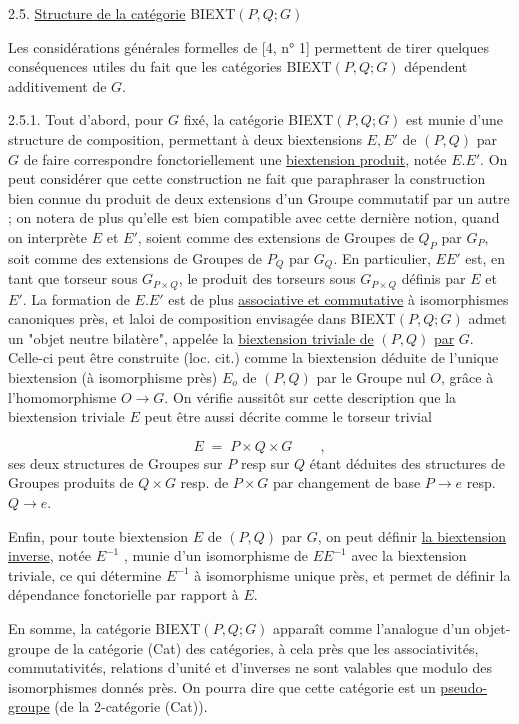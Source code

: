 2.5. \underline{Structure de la catégorie} BIEXT$(P,Q;G)$

Les considérations générales formelles de [4, n° 1] permettent de tirer quelques conséquences utiles du fait que les  catégories BIEXT$(P,Q;G)$  dépendent additivement de $G$.

2.5.1. Tout d'abord, pour $G$ fixé, la catégorie BIEXT$(P,Q;G)$ est munie d'une structure de composition, permettant à deux biextensions $E,E'$ de $(P,Q )$ par $G$ de faire correspondre fonctoriellement une \underline{biextension produit}, notée $E.E'$. On peut considérer que cette construction ne fait que paraphraser la construction bien connue du produit de deux extensions d'un Groupe commutatif par un autre ; on notera de plus qu'elle est bien compatible avec cette dernière notion, quand on interprète $E$ et $E'$, soient comme des extensions de Groupes de $Q_P$ par $G_P$, soit comme des extensions de Groupes de $P_Q$ par $G_Q$. En particulier, $EE'$ est, en tant que torseur
sous $G_{P \times Q}$, le produit des torseurs sous $G_{P \times Q}$ définis par $E$ et $E'$. La formation de $E.E'$ est de plus \underline{associative et commutative} à isomorphismes canoniques près, et laloi de composition envisagée dans BIEXT$(P,Q;G)$ admet un "objet neutre bilatère", appelée la \underline{biextension triviale de} $(P,Q)$ \underline{par} $G$. Celle-ci peut être construite (loc. cit.) comme la biextension déduite de l'unique biextension (à isomorphisme près) $E_o$ de $(P,Q)$ par le Groupe nul $O$, grâce à l'homomorphisme  $O \longrightarrow G$. On vérifie aussitôt sur cette description que la biextension triviale $E$ peut être aussi décrite comme le torseur trivial

\begin{equation*}
E \;=\; P \times Q \times G \qquad ,
\end{equation*}
ses deux structures de Groupes sur $P$ resp  sur $Q$ étant déduites des structures de Groupes produits de $Q \times G$ resp. de $P \times G$ par changement de base $P \longrightarrow e$ resp. $Q \longrightarrow e$.

Enfin, pour toute biextension $E$ de $(P,Q)$ par $G$, on peut définir \underline{la biextension inverse}, notée $E^{-1}$ , munie d'un isomorphisme de $EE^{-1}$ avec la biextension triviale, ce qui détermine $E^{-1}$ à isomorphisme unique près, et permet de définir la dépendance fonctorielle par rapport à $E$.

En somme, la catégorie BIEXT$(P,Q;G)$ apparaît comme l'analogue d'un objet-groupe de la catégorie (Cat) des catégories, à cela près que les associativités, commutativités, relations d'unité et d'inverses ne sont valables que modulo des isomorphismes donnés près. On pourra dire que cette catégorie est un \underline{pseudo-groupe} (de la 2-catégorie (Cat)).


